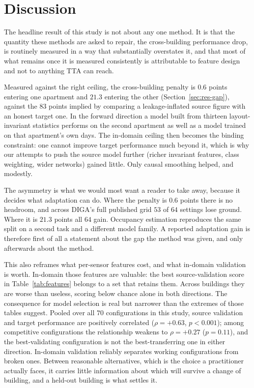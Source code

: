\documentclass[a4paper,fleqn]{cas-dc}
\begin{document}
\section{Discussion}
\label{sec:discussion}

The headline result of this study is not about any one method. It is that the quantity
these methods are asked to repair, the cross-building performance drop, is routinely
measured in a way that substantially overstates it, and that most of what remains once it is
measured consistently is attributable to feature design and not to anything TTA can
reach.

Measured against the right ceiling, the cross-building penalty is $0.6$ points entering
one apartment and $21.3$ entering the other (Section~\ref{sec:res-gap}), against the $83$
points implied by comparing a leakage-inflated source figure with an honest target one.
In the forward direction a model built from thirteen layout-invariant statistics performs
on the second apartment as well as a model trained on that apartment's own days. The
in-domain ceiling then becomes the binding constraint: one cannot improve target
performance much beyond it, which is why our attempts to push the source model further
(richer invariant features, class weighting, wider networks) gained little. Only causal
smoothing helped, and modestly.

The asymmetry is what we would most want a reader to take away, because it decides what
adaptation can do. Where the penalty is $0.6$ points there is no headroom, and across
DIGA's full published grid $53$ of $64$ settings lose ground. Where it is $21.3$ points
all $64$ gain. Occupancy estimation reproduces the same split on a second task and a
different model family. A reported adaptation gain is therefore first of all a statement
about the gap the method was given, and only afterwards about the method.

This also reframes what per-sensor features cost, and what in-domain validation is worth.
In-domain those features are valuable: the best source-validation score in
Table~\ref{tab:features} belongs to a set that retains them. Across buildings they are
worse than useless, scoring below chance alone in both directions. The consequence for
model selection is real but narrower than the extremes of those tables suggest. Pooled
over all $70$ configurations in this study, source validation and target performance are
positively correlated ($\rho=+0.63$, $p<0.001$); among competitive configurations the
relationship weakens to $\rho=+0.27$ ($p=0.11$), and the best-validating configuration is
not the best-transferring one in either direction. In-domain validation reliably separates
working configurations from broken ones. Between reasonable alternatives, which is the
choice a practitioner actually faces, it carries little information about which will
survive a change of building, and a held-out building is what settles it.
\end{document}
